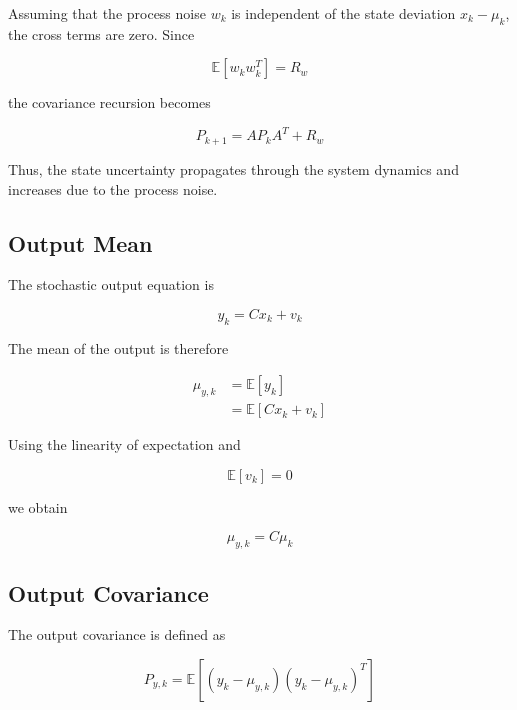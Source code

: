 Assuming that the process noise \(w_k\) is independent of the state deviation \(x_k-\mu_k\), the cross terms are zero. Since

\begin{equation}
    \mathbb{E}[w_kw_k^T]=R_w
\end{equation}

the covariance recursion becomes

\begin{equation}
    \boxed{
    P_{k+1}
    =
    AP_kA^T+R_w
    }
    \label{eq:state_covariance}
\end{equation}

Thus, the state uncertainty propagates through the system dynamics and increases due to the process noise.

\subsection{Output Mean}

The stochastic output equation is

\begin{equation}
    y_k=Cx_k+v_k
\end{equation}

The mean of the output is therefore

\begin{align}
    \mu_{y,k}
    &=
    \mathbb{E}[y_k] \\
    &=
    \mathbb{E}[Cx_k+v_k]
\end{align}

Using the linearity of expectation and

\begin{equation}
    \mathbb{E}[v_k]=0
\end{equation}

we obtain

\begin{equation}
    \boxed{
    \mu_{y,k}
    =
    C\mu_k
    }
    \label{eq:output_mean}
\end{equation}

\subsection{Output Covariance}

The output covariance is defined as

\begin{equation}
    P_{y,k}
    =
    \mathbb{E}
    \left[
        (y_k-\mu_{y,k})
        (y_k-\mu_{y,k})^T
    \right]
\end{equation}

